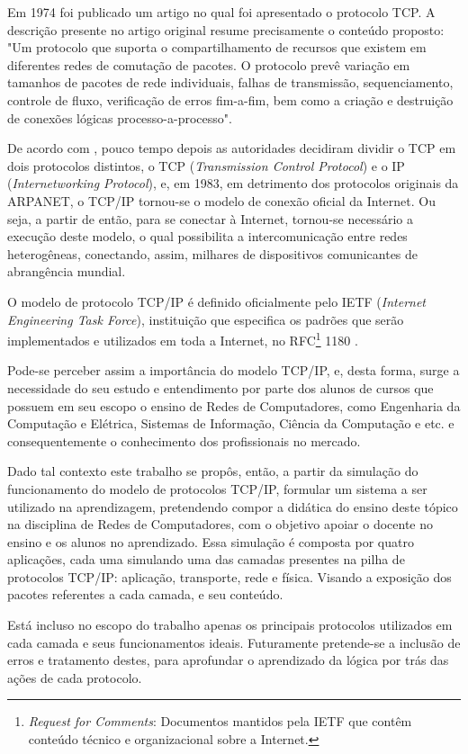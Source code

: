 Em 1974 foi publicado um artigo \cite{Cerf} no qual foi apresentado o protocolo TCP. A descrição presente no artigo original resume precisamente o conteúdo proposto: "Um protocolo que suporta o compartilhamento de recursos que existem em diferentes redes de comutação de pacotes. O protocolo prevê variação em tamanhos de pacotes de rede individuais, falhas de transmissão, sequenciamento, controle de fluxo, verificação de erros fim-a-fim, bem como a criação e destruição de conexões lógicas processo-a-processo".

De acordo com , pouco tempo depois as autoridades decidiram dividir o TCP em dois protocolos distintos, o TCP (\textit{Transmission Control Protocol}) e o IP (\textit{Internetworking Protocol}), e, em 1983, em detrimento dos protocolos originais da ARPANET, o TCP/IP tornou-se o modelo de conexão oficial da Internet. Ou seja, a partir de então, para se conectar à Internet, tornou-se necessário a execução deste modelo, o qual possibilita a intercomunicação entre redes heterogêneas, conectando, assim, milhares de dispositivos comunicantes de abrangência mundial.

O modelo de protocolo TCP/IP é definido oficialmente pelo IETF (\textit{Internet Engineering Task Force}), instituição que especifica os padrões que serão implementados e utilizados em toda a Internet, no RFC\footnote{\textit{Request for Comments}: Documentos mantidos pela IETF que contêm conteúdo técnico e organizacional sobre a Internet.} 1180 \cite{RFC1180}.

Pode-se perceber assim a importância do modelo TCP/IP, e, desta forma, surge a necessidade do seu estudo e entendimento por parte dos alunos de cursos que possuem em seu escopo o ensino de Redes de Computadores, como Engenharia da Computação e Elétrica, Sistemas de Informação, Ciência da Computação e etc. e consequentemente o conhecimento dos profissionais no mercado.

Dado tal contexto este trabalho se propôs, então, a partir da simulação do funcionamento do modelo de protocolos TCP/IP, formular um sistema a ser utilizado na aprendizagem, pretendendo compor a didática do ensino deste t\'opico na disciplina de Redes de Computadores, com o objetivo apoiar o docente no ensino e os alunos no aprendizado. Essa simulação é composta por quatro aplicações, cada uma simulando uma das camadas presentes na pilha de protocolos TCP/IP: aplicação, transporte, rede e física. Visando a exposição dos pacotes referentes a cada camada, e seu conteúdo. 

Está incluso no escopo do trabalho apenas os principais protocolos utilizados em cada camada e seus funcionamentos ideais. Futuramente pretende-se a inclusão de erros e tratamento destes, para aprofundar o aprendizado da lógica por trás das ações de cada protocolo. 